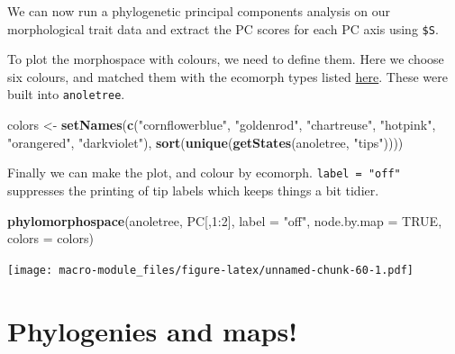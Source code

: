 \documentclass[]{book}
\newenvironment{Shaded}{\begin{snugshade}}{\end{snugshade}}
\newcommand{\KeywordTok}[1]{\textcolor[rgb]{0.13,0.29,0.53}{\textbf{{#1}}}}
\newcommand{\DataTypeTok}[1]{\textcolor[rgb]{0.13,0.29,0.53}{{#1}}}
\newcommand{\DecValTok}[1]{\textcolor[rgb]{0.00,0.00,0.81}{{#1}}}
\newcommand{\StringTok}[1]{\textcolor[rgb]{0.31,0.60,0.02}{{#1}}}
\newcommand{\OtherTok}[1]{\textcolor[rgb]{0.56,0.35,0.01}{{#1}}}
\newcommand{\NormalTok}[1]{{#1}}
\theoremstyle{definition}
\theoremstyle{definition}
\theoremstyle{definition}
\theoremstyle{remark}
\begin{document}
We can now run a phylogenetic principal components analysis on our
morphological trait data and extract the PC scores for each PC axis
using \texttt{\$S}.

\begin{Shaded}
\end{Shaded}

To plot the morphospace with colours, we need to define them. Here we
choose six colours, and matched them with the ecomorph types listed
\href{https://en.wikipedia.org/wiki/Anolis_ecomorphs}{here}. These were
built into \texttt{anoletree}.

\begin{Shaded}
\begin{Highlighting}[]
\NormalTok{colors <-}\StringTok{ }\KeywordTok{setNames}\NormalTok{(}\KeywordTok{c}\NormalTok{(}\StringTok{"cornflowerblue"}\NormalTok{, }\StringTok{"goldenrod"}\NormalTok{, }\StringTok{"chartreuse"}\NormalTok{, }\StringTok{"hotpink"}\NormalTok{,}
                     \StringTok{"orangered"}\NormalTok{, }\StringTok{"darkviolet"}\NormalTok{), }
                     \KeywordTok{sort}\NormalTok{(}\KeywordTok{unique}\NormalTok{(}\KeywordTok{getStates}\NormalTok{(anoletree, }\StringTok{"tips"}\NormalTok{))))}
\end{Highlighting}
\end{Shaded}

Finally we can make the plot, and colour by ecomorph.
\texttt{label\ =\ "off"} suppresses the printing of tip labels which
keeps things a bit tidier.

\begin{Shaded}
\begin{Highlighting}[]
\KeywordTok{phylomorphospace}\NormalTok{(anoletree, PC[,}\DecValTok{1}\NormalTok{:}\DecValTok{2}\NormalTok{], }\DataTypeTok{label =} \StringTok{"off"}\NormalTok{, }\DataTypeTok{node.by.map =} \OtherTok{TRUE}\NormalTok{, }\DataTypeTok{colors =} \NormalTok{colors)}
\end{Highlighting}
\end{Shaded}

\texttt{[image: macro-module\_files/figure-latex/unnamed-chunk-60-1.pdf]}

\section{Phylogenies and maps!}\label{phylogenies-and-maps}
\end{document}
